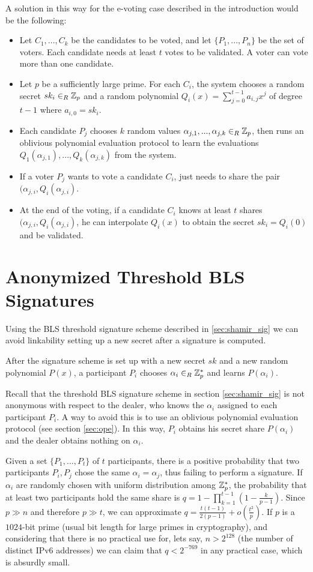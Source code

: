 A solution in this way for the e-voting case described in the introduction would be the following:
\begin{itemize}[align = left, leftmargin=*, label={--}]
\item Let $C_1, ..., C_k$ be the candidates to be voted, and let $\{P_1, ..., P_n\}$ be the set of voters. Each candidate needs at least $t$ votes to be validated. A voter can vote more than one candidate.
\item Let $p$ be a sufficiently large prime. For each $C_i$, the system chooses a random secret $sk_i \in_R {\mathbb Z}_p$ and a random polynomial $Q_i(x) = \sum_{j=0}^{t-1} a_{i,j} x^j$ of degree $t-1$ where $a_{i,0} = sk_i$.
\item Each candidate $P_j$ chooses $k$ random values $\alpha_{j,1}, ..., \alpha_{j,k} \in_R {\mathbb Z}_p$, then runs an oblivious polynomial evaluation protocol to learn the evaluations $Q_1(\alpha_{j,1}), ..., Q_k(\alpha_{j,k})$ from the system.
\item If a voter $P_j$ wants to vote a candidate $C_i$, just needs to share the pair $(\alpha_{j,i},Q_i(\alpha_{j,i})$.
\item At the end of the voting, if a candidate $C_i$ knows at least $t$ shares $(\alpha_{j,i},Q_i(\alpha_{j,i})$, he can interpolate $Q_i(x)$ to obtain the secret $sk_i = Q_i(0)$ and be validated.
\end{itemize}

\section{Anonymized Threshold BLS Signatures}
\label{sec:thr_bls}
Using the BLS threshold signature scheme described in \ref{sec:shamir_sig} we can avoid linkability setting up a new secret after a signature is computed.

After the signature scheme is set up with a new secret $sk$ and a new random polynomial $P(x)$, a participant $P_i$ chooses $\alpha_i \in_R {\mathbb Z}_p^\ast$ and learns $P(\alpha_i)$.

Recall that the threshold BLS signature scheme in section \ref{sec:shamir_sig} is not anonymous with respect to the dealer, who knows the $\alpha_i$ assigned to each participant $P_i$. A way to avoid this is to use an oblivious polynomial evaluation protocol (see section \ref{sec:ope}). In this way, $P_i$ obtains his secret share $P(\alpha_i)$ and the dealer obtains nothing on $\alpha_i$.

Given a set $\{P_1, ..., P_t\}$ of $t$ participants, there is a positive probability that two participants $P_i,P_j$ chose the same $\alpha_i = \alpha_j$, thus failing to perform a signature. If $\alpha_i$ are randomly chosen with uniform distribution among ${\mathbb Z}_p^\ast$, the probability that at least two participants hold the same share is $q = 1 - \prod_{k=1}^{t-1} (1-\frac{k}{p-1})$. Since $p \gg n$ and therefore $p \gg t$, we can approximate $q = \frac{t(t-1)}{2(p-1)} + o\left(\frac{t^2}{p}\right)$. If $p$ is a $1024$-bit prime (usual bit length for large primes in cryptography), and considering that there is no practical use for, lets say, $n > 2^{128}$ (the number of distinct IPv6 addresses) we can claim that $q < 2^{-769}$ in any practical case, which is absurdly small.